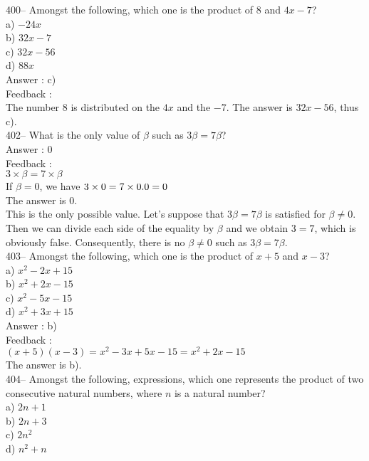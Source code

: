 \documentclass[letterpaper, 12pt]{article}
\begin{document}
400-- Amongst the following, which one is the product of 8 and
$4x-7$?\\
a) $-24x$\\
b) $32x-7$\\
c) $32x-56$\\
d) $88x$\\

Answer : c)\\

Feedback : \\
The number 8 is distributed on the $4x$ and the $-7$. The answer is $32x-56$, thus c).\\


402-- What is the only value of $\beta$ such as $3\beta=7\beta$?\\

Answer : 0 \\

Feedback : \\
$3\times \beta = 7 \times \beta $\\
If $\beta=0$, we have $3\times0=7\times 0.\\
0=0$\\
The answer is 0.\\

This is the only possible value. Let's suppose that $3\beta=7\beta$ is satisfied for $\beta\neq0$. Then we can divide each side of the equality by $\beta$ and we obtain $3=7$, which is obviously false. Consequently, there is no $\beta\neq0$ such as $3\beta=7\beta$.\\

403-- Amongst the following, which one is the product of $x+5$ and
$x-3$?\\
a) $x^{2}-2x+15$ \\
b) $x^{2}+2x-15$\\
c) $x^{2}-5x-15$\\
d) $x^{2}+3x+15$\\

Answer : b)\\

Feedback : \\
$\left( x+5\right) \left( x-3\right)=x^{2}-3x+5x-15=x^{2}+2x-15$\\
The answer is b).\\

404-- Amongst the following, expressions, which one represents the product of two consecutive natural numbers, where $n$ is a natural number?\\
a) $2n+1$\\
b) $2n+3$ \\
c) $2n^{2}$\\
d) $n^{2}+n$\\
\end{document}
